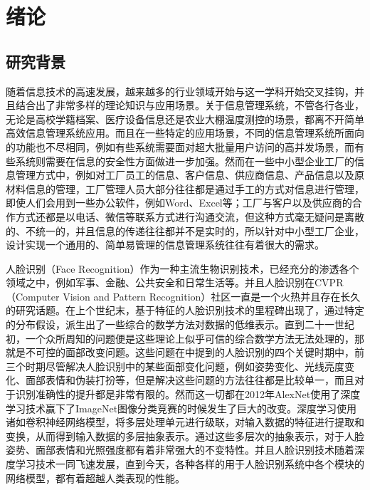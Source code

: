 \section{绪论}
\setlength{\baselineskip}{20pt}
\fancyhf{}
\renewcommand{\headrulewidth}{0.5pt}

\subsection{研究背景}

随着信息技术的高速发展，越来越多的行业领域开始与这一学科开始交叉挂钩，并且结合出了非常多样的理论知识与应用场景。关于信息管理系统，不管各行各业，无论是高校学籍档案、医疗设备信息还是农业大棚温度测控的场景，都离不开简单高效信息管理系统应用。而且在一些特定的应用场景，不同的信息管理系统所面向的功能也不尽相同，例如有些系统需要面对超大批量用户访问的高并发场景，而有些系统则需要在信息的安全性方面做进一步加强。然而在一些中小型企业工厂的信息管理方式中，例如对工厂员工的信息、客户信息、供应商信息、产品信息以及原材料信息的管理，工厂管理人员大部分往往都是通过手工的方式对信息进行管理，即使人们会用到一些办公软件，例如Word、Excel等；工厂与客户以及供应商的合作方式还都是以电话、微信等联系方式进行沟通交流，但这种方式毫无疑问是离散的、不统一的，并且信息的传递往往都并不是实时的，所以针对中小型工厂企业，设计实现一个通用的、简单易管理的信息管理系统往往有着很大的需求。

人脸识别（Face Recognition）作为一种主流生物识别技术，已经充分的渗透各个领域之中，例如军事、金融、公共安全和日常生活等。并且人脸识别在CVPR（Computer Vision and Pattern Recognition）社区一直是一个火热并且存在长久的研究话题。在上个世纪末，基于特征的人脸识别技术的里程碑出现了，通过特定的分布假设，派生出了一些综合的数学方法对数据的低维表示。直到二十一世纪初，一个众所周知的问题便是这些理论上似乎可信的综合数学方法无法处理的，那就是不可控的面部改变问题。这些问题在\cite{deepfrsurvey}中提到的人脸识别的四个关键时期中，前三个时期尽管解决人脸识别中的某些面部变化问题，例如姿势变化、光线亮度变化、面部表情和伪装打扮等，但是解决这些问题的方法往往都是比较单一，而且对于识别准确性的提升都是非常有限的。然而这一切都在2012年AlexNet使用了深度学习技术赢下了ImageNet图像分类竞赛的时候发生了巨大的改变。深度学习使用诸如卷积神经网络模型，将多层处理单元进行级联，对输入数据的特征进行提取和变换，从而得到输入数据的多层抽象表示。通过这些多层次的抽象表示，对于人脸姿势、面部表情和光照强度都有着非常强大的不变特性。并且人脸识别技术随着深度学习技术一同飞速发展，直到今天，各种各样的用于人脸识别系统中各个模块的网络模型，都有着超越人类表现的性能。

